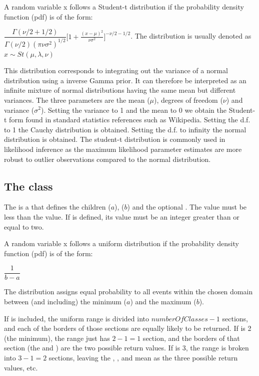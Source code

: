 A random variable x follows a Student-t distribution if the probability density function (pdf) is of the form:

\begin{center}
$\dfrac{\Gamma(\nu/2+1/2)}{\Gamma(\nu/2)(\pi\nu\sigma^2)^{1/2}}\big[1+\frac{(x-\mu)^2}{\nu\sigma^2}\big]^{-\nu/2-1/2}$. The distribution is usually denoted as $x\sim St(\mu,\lambda,\nu)$
\end{center}

This distribution corresponds to integrating out the variance of a normal distribution using a inverse Gamma prior. It can therefore be interpreted as an infinite mixture of normal distributions having the same mean but different variances. The three parameters are the mean ($\mu$), degrees of freedom ($\nu$) and variance ($\sigma^2$). Setting the variance to 1 and the mean to 0 we obtain the Student-t form found in standard statistics references such as Wikipedia. Setting the d.f. to 1 the Cauchy distribution is obtained. Setting the d.f. to infinity the normal distribution is obtained. The student-t distribution is commonly used in likelihood inference as the maximum likelihood parameter estimates are more robust to outlier observations compared to the normal distribution.

\subsection{The  class}
\label{UniformDistribution-class}
\label{uniformdistribution-class}

The \UniformDistribution is a \ContinuousUnivariateDistribution that defines the \UncertValue children  ($a$),  ($b$) and the optional .  The  value must be less than the  value.  If  is defined, its value must be an integer greater than or equal to two.

A random variable x follows a uniform distribution if the probability density function (pdf) is of the form:

\begin{center}
$\dfrac{1}{b-a}$
\end{center}

The distribution assigns equal probability to all events within the chosen domain between (and including) the minimum ($a$) and the maximum ($b$).

If  is included, the uniform range is divided into $numberOfClasses-1$ sections, and each of the borders of those sections are equally likely to be returned.  If  is 2 (the minimum), the range just has $2-1=1$ section, and the borders of that section (the  and ) are the two possible return values.  If  is 3, the range is broken into $3-1=2$ sections, leaving the , , and mean as the three possible return values, etc.


